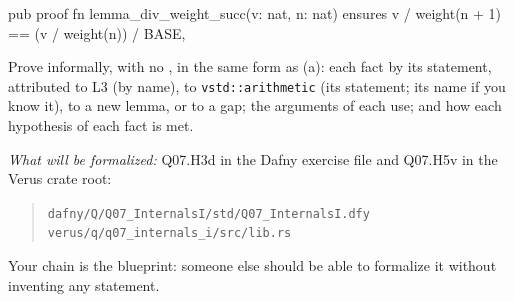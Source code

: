 \documentclass[11pt]{article}
\begin{document}
\begin{problem}
\begin{enumerate}
\begin{veruscode}
pub proof fn lemma_div_weight_succ(v: nat, n: nat)
    ensures
        v / weight(n + 1) == (v / weight(n)) / BASE,
\end{veruscode}
  Prove  informally, with no
  , in the same form as (a): each fact by its statement,
  attributed to L3 (by name), to \texttt{vstd::arithmetic} (its statement; its
  name if you know it), to a new lemma, or to a gap; the arguments of each use;
  and how each hypothesis of each fact is met.
\end{enumerate}
\emph{What will be formalized:} Q07.H3d in the Dafny exercise file and Q07.H5v
in the Verus crate root:
\begin{quote}
\texttt{dafny/Q/Q07\_InternalsI/std/Q07\_InternalsI.dfy} \\
\texttt{verus/q/q07\_internals\_i/src/lib.rs}
\end{quote}
\noindent Your chain is the blueprint: someone else should be able to
formalize it without inventing any statement.
\end{problem}
\end{document}
